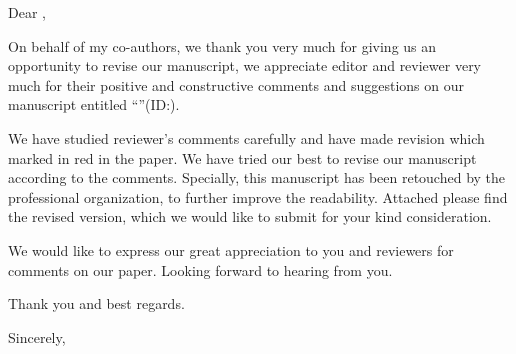 \noindent Dear \editorname,

On behalf of my co-authors, we thank you very much for giving us an opportunity to revise our manuscript, we appreciate editor and reviewer very much for their positive and constructive comments and suggestions on our manuscript entitled \enquote{\thetitle}(ID:\manuscript).

We have studied reviewer's comments carefully and have made revision which marked in red in the paper. We have tried our best to revise our manuscript according to the comments. Specially, this manuscript has been retouched by the professional organization, to further improve the readability. Attached please find the revised version, which we would like to submit for your kind consideration.

We would like to express our great appreciation to you and reviewers for comments on our paper. Looking forward to hearing from you.

Thank you and best regards.

\vspace{1.2em}

\noindent Sincerely,

\vspace{1.5em}

\noindent \theauthor